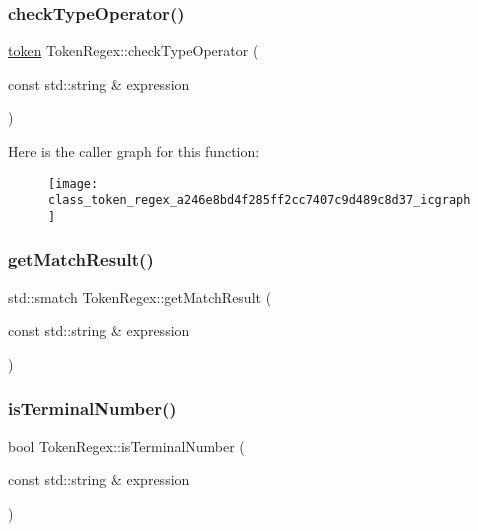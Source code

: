 \subsubsection{\texorpdfstring{checkTypeOperator()}{checkTypeOperator()}}
{\footnotesize\ttfamily \mbox{\hyperlink{structtoken}{token}} Token\+Regex\+::check\+Type\+Operator (\begin{DoxyParamCaption}\item[{const std\+::string \&}]{expression }\end{DoxyParamCaption})}

Here is the caller graph for this function\+:
\nopagebreak
\begin{figure}[H]
\begin{center}
\leavevmode
\texttt{[image: class\_token\_regex\_a246e8bd4f285ff2cc7407c9d489c8d37\_icgraph]}
\end{center}
\end{figure}
\mbox{\label{class_token_regex_a65932ff8f3b44a2bd99662208d289d8c}} 
\subsubsection{\texorpdfstring{getMatchResult()}{getMatchResult()}}
{\footnotesize\ttfamily std\+::smatch Token\+Regex\+::get\+Match\+Result (\begin{DoxyParamCaption}\item[{const std\+::string \&}]{expression }\end{DoxyParamCaption})}

\mbox{\label{class_token_regex_a852aa68c4606f9c9f1bd9350d2e783f0}} 
\subsubsection{\texorpdfstring{isTerminalNumber()}{isTerminalNumber()}}
{\footnotesize\ttfamily bool Token\+Regex\+::is\+Terminal\+Number (\begin{DoxyParamCaption}\item[{const std\+::string \&}]{expression }\end{DoxyParamCaption})}

